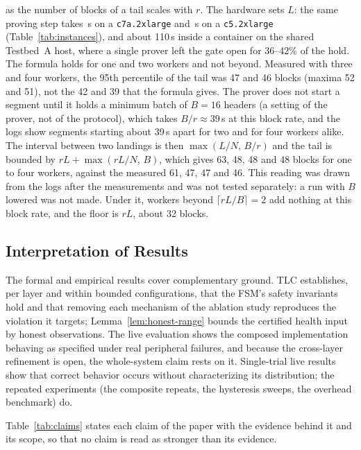 as the number of blocks of a tail scales with $r$. The hardware sets $L$: the same proving step takes
\resCloudStepFast\,s on a \texttt{c7a.2xlarge} and \resCloudStepSlow\,s on a \texttt{c5.2xlarge}
(Table~\ref{tab:instances}), and about 110\,s inside a container on the shared Testbed~A host, where a single
prover left the gate open for 36--42\% of the hold.
The formula holds for one and two workers and not beyond. Measured with three and four workers, the 95th percentile of the tail was 47 and 46 blocks
(maxima 52 and 51), not the 42 and 39 that the formula gives. The prover does not start a segment until it holds a minimum batch of $B{=}16$ headers (a setting of the prover,
not of the protocol), which takes $B/r\approx 39$\,s at this block rate, and the logs show segments starting about 39\,s apart for two and for four workers alike.
The interval between two landings is then $\max(L/N,\,B/r)$ and the tail is bounded by $rL+\max(rL/N,\,B)$, which gives 63, 48, 48 and 48 blocks for one to four workers, against the measured 61, 47, 47 and 46.
This reading was drawn from the logs after the measurements and was not tested separately: a run with $B$ lowered was not made. Under it, workers beyond $\lceil rL/B\rceil{=}2$ add nothing at this block rate, and the floor is $rL$, about 32 blocks.

\subsection{Interpretation of Results}

The formal and empirical results cover complementary ground. TLC establishes, per
layer and within bounded configurations, that the FSM's safety invariants hold and
that removing each mechanism of the ablation study reproduces the violation it
targets; Lemma~\ref{lem:honest-range} bounds the certified health input by honest
observations. The live evaluation shows the composed implementation behaving as
specified under real peripheral failures, and because the cross-layer refinement is
open, the whole-system claim rests on it. Single-trial live results show that
correct behavior occurs without characterizing its distribution; the repeated
experiments (the composite repeats, the hysteresis sweeps, the overhead benchmark)
do.

Table~\ref{tab:claims} states each claim of the paper with the evidence behind it
and its scope, so that no claim is read as stronger than its evidence.

